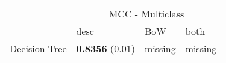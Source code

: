 \begin{tabular}{|l|l|l|l| }
\hline
 &  \multicolumn{3}{c|}{ MCC - Multiclass} \\
\cline{2-4} & desc & BoW & both \\ \hline
Decision Tree & {\bf 0.8356} (0.01) & missing  & missing \\
\hline
\end{tabular}